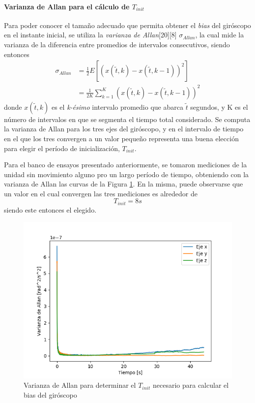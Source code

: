 \paragraph{Varianza de Allan para el cálculo de $T_{init}$}
Para poder conocer el tamaño adecuado que permita obtener el \textit{bias} del giróscopo en el instante inicial, se utiliza la \textit{varianza de Allan}[20][8] $\sigma_{Allan}$, la cual mide la varianza de la diferencia entre promedios de intervalos consecutivos, siendo entonces
\begin{align}
    \sigma_{Allan} &= \frac{1}{2} E[(x(\tilde{t},k) - x(\tilde{t},k-1))^2] \\
    &= \frac{1}{2K}\sum_{k=1}^K(x(\tilde{t},k) - x(\tilde{t},k-1))^2
\end{align}
donde $x(\tilde{t},k)$ es el \textit{k-ésimo} intervalo promedio que abarca $\tilde{t}$ segundos, y K es el número de intervalos en que se segmenta el tiempo total considerado. Se computa la varianza de Allan para los tres ejes del giróscopo, y en el intervalo de tiempo en el que los tres convergen a un valor pequeño representa una buena elección para elegir el período de inicialización, $T_{init}$.

Para el banco de ensayos presentado anteriormente, se tomaron mediciones de la unidad sin movimiento alguno pro un largo período de tiempo, obteniendo con la varianza de Allan las curvas de la Figura \ref{fig:imugyrovariance}. En la misma, puede observarse que un valor en el cual convergen las tres mediciones es alrededor de
\begin{equation}
    T_{init} = 8 s
\end{equation}
siendo este entonces el elegido.
\begin{figure}
    \centering
    \includegraphics[width=\textwidth]{Img/IMUGyroVariance.png}
    \caption{Varianza de Allan para determinar el $T_{init}$ necesario para calcular el bias del giróscopo}
    \label{fig:imugyrovariance}
\end{figure}

